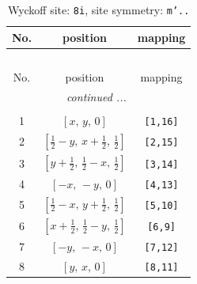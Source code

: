 \documentclass[fleqn,8pt]{jsarticle}
\begin{document}
\renewcommand{\arraystretch}{1.2}
\begin{longtable}{ccc}
\caption{Wyckoff site: {\tt 8i}, site symmetry: {\tt m'..}}
 \\
 \hline \hline
No. & position & mapping \\ \hline \endfirsthead

\multicolumn{2}{l}{\tablename\ \thetable{}} \\
 \hline \hline
No. & position & mapping \\ \hline \endhead

 \hline \hline
\multicolumn{2}{r}{\footnotesize\it continued ...} \\ \endfoot

 \hline \hline
\multicolumn{2}{r}{} \\ \endlastfoot

1 & $\left[ x,\, y,\, 0 \right]$ & {\tt [1,16]} \\ \hline
2 & $\left[ \frac{1}{2} - y,\, x + \frac{1}{2},\, \frac{1}{2} \right]$ & {\tt [2,15]} \\ \hline
3 & $\left[ y + \frac{1}{2},\, \frac{1}{2} - x,\, \frac{1}{2} \right]$ & {\tt [3,14]} \\ \hline
4 & $\left[ - x,\, - y,\, 0 \right]$ & {\tt [4,13]} \\ \hline
5 & $\left[ \frac{1}{2} - x,\, y + \frac{1}{2},\, \frac{1}{2} \right]$ & {\tt [5,10]} \\ \hline
6 & $\left[ x + \frac{1}{2},\, \frac{1}{2} - y,\, \frac{1}{2} \right]$ & {\tt [6,9]} \\ \hline
7 & $\left[ - y,\, - x,\, 0 \right]$ & {\tt [7,12]} \\ \hline
8 & $\left[ y,\, x,\, 0 \right]$ & {\tt [8,11]} \\
\end{longtable}
\renewcommand{\arraystretch}{1.2}
\end{document}
